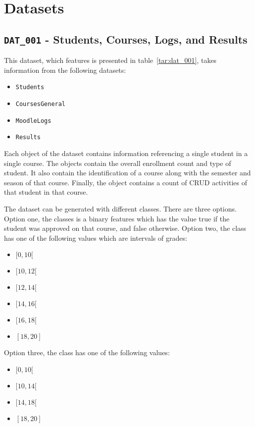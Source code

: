 \section{Datasets}

\subsection{\texttt{DAT\_001} - Students, Courses, Logs, and Results}
\label{sec:dat_001}

This dataset, which features is presented in table~\ref{tar:dat_001}, takes
information from the following datasets:

\begin{itemize}
    \item \texttt{Students}
    \item \texttt{CoursesGeneral}
    \item \texttt{MoodleLogs}
    \item \texttt{Results}
\end{itemize}

Each object of the dataset contains information referencing a single student in
a single course. The objects contain the overall enrollment count and type of
student. It also contain the identification of a course along with the semester
and season of that course. Finally, the object contains a count of CRUD
activities of that student in that course.

The dataset can be generated with different classes. There are three options.
Option one, the classes is a binary features which has the value true if the
student was approved on that course, and false otherwise. Option two, the class
has one of the following values which are intervals of grades:

\begin{itemize}
    \item $ [0, 10[ $
    \item $ [10, 12[ $
    \item $ [12, 14[ $
    \item $ [14, 16[ $
    \item $ [16, 18[ $
    \item $ [18, 20] $
\end{itemize}

Option three, the class has one of the following values:

\begin{itemize}
    \item $ [0, 10[ $
    \item $ [10, 14[ $
    \item $ [14, 18[ $
    \item $ [18, 20] $
\end{itemize}

